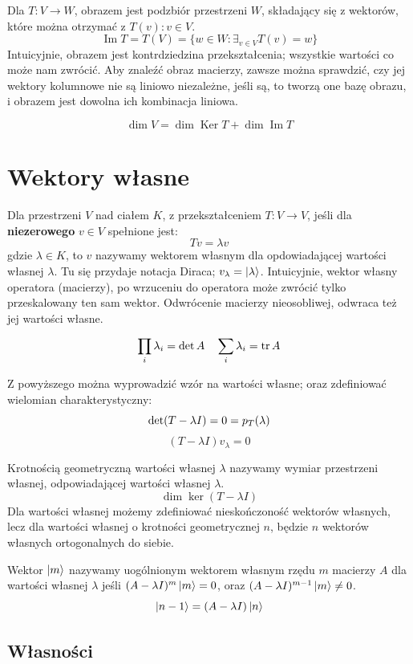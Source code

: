 \documentclass{../notatki}
\begin{document}
Dla $T: V \to W$, obrazem jest podzbiór przestrzeni $W$, składający się z
wektorów, które można otrzymać z $T(v) : v \in V$.
$$
\operatorname{Im} T = T(V) = \{w \in W: \exists_{v \in V} T(v) = w\}
$$
Intuicyjnie, obrazem jest kontrdziedzina przekształcenia; wszystkie wartości
co może nam zwrócić. Aby znaleźć obraz macierzy, zawsze można sprawdzić, czy jej
wektory kolumnowe nie są liniowo niezależne, jeśli są, to tworzą one
bazę obrazu, i obrazem jest dowolna ich kombinacja liniowa.

$$
\dim V = \dim \operatorname{Ker} T + \dim \operatorname{Im} T
$$

\section{Wektory własne}

Dla przestrzeni $V$ nad ciałem $K$, z przekształceniem $T: V \to V$, jeśli
dla \textbf{niezerowego} $v \in V$ spełnione jest:
$$
Tv = \lambda v
$$
gdzie $\lambda \in K$, to $v$ nazywamy wektorem własnym dla opdowiadającej
wartości własnej $\lambda$. Tu się przydaje notacja Diraca;
$v_\lambda = \ket{\lambda}$. Intuicyjnie, wektor własny operatora (macierzy),
po wrzuceniu do operatora może zwrócić tylko przeskalowany ten sam wektor.
Odwrócenie macierzy nieosobliwej, odwraca też jej wartości własne.

$$
\prod_i \lambda_i = \det A \quad \sum_i \lambda_i = \tr A
$$

Z powyższego można wyprowadzić wzór na wartości własne; oraz
zdefiniować wielomian charakterystyczny:
$$
\determinant (T - \lambda I) = 0 = p_T(\lambda)
$$
$$
(T - \lambda I)v_\lambda = 0
$$

Krotnością geometryczną wartości własnej $\lambda$ nazywamy wymiar przestrzeni
własnej, odpowiadającej wartości własnej $\lambda$.
$$
\dim \ker (T - \lambda I)
$$
Dla wartości własnej możemy zdefiniować nieskończoność wektorów własnych, lecz
dla wartości własnej o krotności geometrycznej $n$, będzie $n$ wektorów własnych
ortogonalnych do siebie.

Wektor $\ket{m}$ nazywamy uogólnionym wektorem własnym rzędu $m$ macierzy $A$
dla wartości własnej $\lambda$ jeśli $(A - \lambda I)^m \ket{m} = 0$, oraz
$(A - \lambda I)^{m - 1} \ket{m} \neq 0$.
$$
\ket{n - 1} = (A - \lambda I) \ket{n}
$$

\subsection{Własności}
\end{document}
